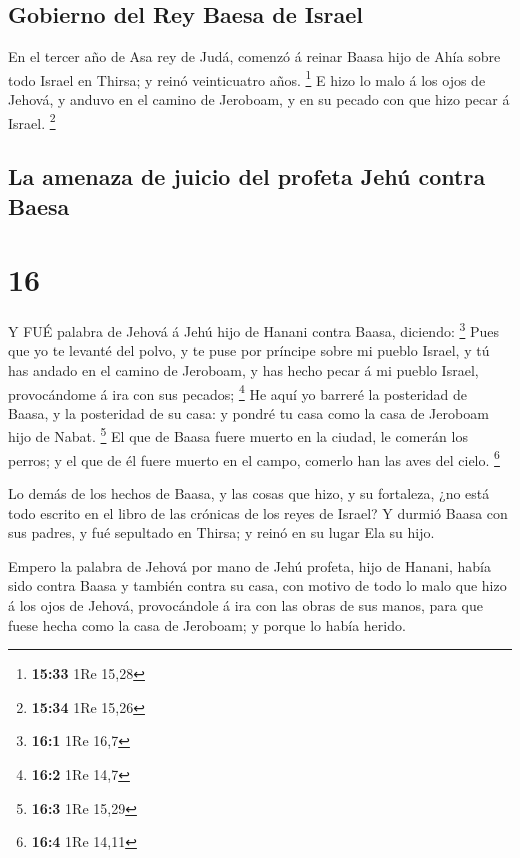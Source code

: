 \hypertarget{gobierno-del-rey-baesa-de-israel}{%
\subsection{Gobierno del Rey Baesa de
Israel}\label{gobierno-del-rey-baesa-de-israel}}

 En el tercer año de Asa rey de Judá, comenzó á reinar
Baasa hijo de Ahía sobre todo Israel en Thirsa; y reinó veinticuatro
años. \footnote{\textbf{15:33} 1Re 15,28}  E hizo lo malo á
los ojos de Jehová, y anduvo en el camino de Jeroboam, y en su pecado
con que hizo pecar á Israel. \footnote{\textbf{15:34} 1Re 15,26}

\hypertarget{la-amenaza-de-juicio-del-profeta-jehuxfa-contra-baesa}{%
\subsection{La amenaza de juicio del profeta Jehú contra
Baesa}\label{la-amenaza-de-juicio-del-profeta-jehuxfa-contra-baesa}}

\hypertarget{section-15}{%
\section{16}\label{section-15}}

 Y FUÉ palabra de Jehová á Jehú hijo de Hanani contra Baasa,
diciendo: \footnote{\textbf{16:1} 1Re 16,7}  Pues que yo te
levanté del polvo, y te puse por príncipe sobre mi pueblo Israel, y tú
has andado en el camino de Jeroboam, y has hecho pecar á mi pueblo
Israel, provocándome á ira con sus pecados; \footnote{\textbf{16:2} 1Re
  14,7}  He aquí yo barreré la posteridad de Baasa, y la
posteridad de su casa: y pondré tu casa como la casa de Jeroboam hijo de
Nabat. \footnote{\textbf{16:3} 1Re 15,29}  El que de Baasa
fuere muerto en la ciudad, le comerán los perros; y el que de él fuere
muerto en el campo, comerlo han las aves del cielo. \footnote{\textbf{16:4}
  1Re 14,11}

 Lo demás de los hechos de Baasa, y las cosas que hizo, y su
fortaleza, ¿no está todo escrito en el libro de las crónicas de los
reyes de Israel?  Y durmió Baasa con sus padres, y fué
sepultado en Thirsa; y reinó en su lugar Ela su hijo.

 Empero la palabra de Jehová por mano de Jehú profeta, hijo
de Hanani, había sido contra Baasa y también contra su casa, con motivo
de todo lo malo que hizo á los ojos de Jehová, provocándole á ira con
las obras de sus manos, para que fuese hecha como la casa de Jeroboam; y
porque lo había herido.

